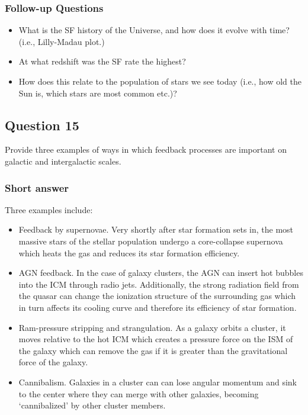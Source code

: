 \documentclass[a4paper,11pt]{article}
\begin{document}
\subsubsection{Follow-up Questions}

\begin{itemize}
    \item What is the SF history of the Universe, and how does it evolve with time? (i.e., Lilly-Madau plot.)
    \item At what redshift was the SF rate the highest?
    \item How does this relate to the population of stars we see today (i.e., how old the Sun is, which stars are most common etc.)?
\end{itemize}


\newpage
\subsection{Question 15}

Provide three examples of ways in which feedback processes are important on galactic and intergalactic scales.

\subsubsection{Short answer}

Three examples include:

\begin{itemize}
    \item Feedback by supernovae. Very shortly after star formation sets in, the most massive stars of the stellar population undergo a core-collapse supernova which heats the gas and reduces its star formation efficiency.
    \item AGN feedback. In the case of galaxy clusters, the AGN can insert hot bubbles into the ICM through radio jets. Additionally, the strong radiation field from the quasar can change the ionization structure of the surrounding gas which in turn affects its cooling curve and therefore its efficiency of star formation.
    \item Ram-pressure stripping and strangulation. As a galaxy orbits a cluster, it moves relative to the hot ICM which creates a pressure force on the ISM of the galaxy which can remove the gas if it is greater than the gravitational force of the galaxy.
    \item Cannibalism. Galaxies in a cluster can can lose angular momentum and sink to the center where they can merge with other galaxies, becoming `cannibalized' by other cluster members.
\end{itemize}
\end{document}
